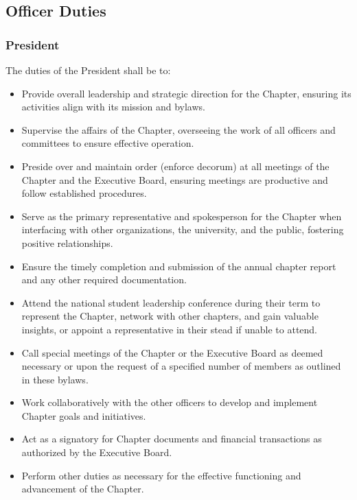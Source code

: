 \documentclass[10pt, oneside]{article}
\begin{document}
\subsection{Officer Duties}

\subsubsection{President}
The duties of the President shall be to:
\begin{itemize}
    \item Provide overall leadership and strategic direction for the Chapter, ensuring its activities align with its mission and bylaws.
    \item Supervise the affairs of the Chapter, overseeing the work of all officers and committees to ensure effective operation.
    \item Preside over and maintain order (enforce decorum) at all meetings of the Chapter and the Executive Board, ensuring meetings are productive and follow established procedures.
    \item Serve as the primary representative and spokesperson for the Chapter when interfacing with other organizations, the university, and the public, fostering positive relationships.
    \item Ensure the timely completion and submission of the annual chapter report and any other required documentation.
    \item Attend the national student leadership conference during their term to represent the Chapter, network with other chapters, and gain valuable insights, or appoint a representative in their stead if unable to attend.
    \item Call special meetings of the Chapter or the Executive Board as deemed necessary or upon the request of a specified number of members as outlined in these bylaws.
    \item Work collaboratively with the other officers to develop and implement Chapter goals and initiatives.
    \item Act as a signatory for Chapter documents and financial transactions as authorized by the Executive Board.
    \item Perform other duties as necessary for the effective functioning and advancement of the Chapter.
\end{itemize}
\end{document}
